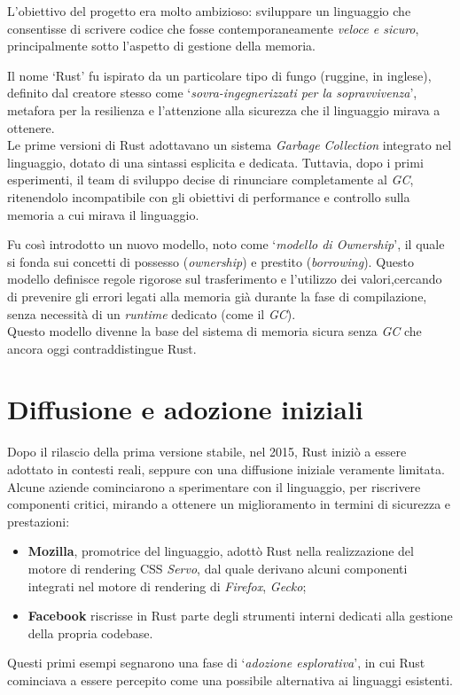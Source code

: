 L'obiettivo del progetto era molto ambizioso: sviluppare un linguaggio che consentisse di scrivere codice 
che fosse contemporaneamente \textit{veloce e sicuro}, principalmente sotto l'aspetto di gestione della memoria.

Il nome `Rust' fu ispirato da un particolare tipo di fungo (ruggine, in inglese), definito dal creatore 
stesso come `\textit{sovra-ingegnerizzati per la sopravvivenza}', metafora per la resilienza e l'attenzione 
alla sicurezza che il linguaggio mirava a ottenere. \hfill
\vspace{10pt}\\
\noindent Le prime versioni di Rust adottavano un sistema \textit{Garbage Collection} integrato nel linguaggio, dotato di una sintassi esplicita e dedicata.
Tuttavia, dopo i primi esperimenti, il team di sviluppo decise di rinunciare completamente al \textit{GC}, ritenendolo incompatibile con gli obiettivi di performance 
e controllo sulla memoria a cui mirava il linguaggio.

Fu così introdotto un nuovo modello, noto come `\textit{modello di Ownership}', il quale si fonda 
sui concetti di possesso (\textit{ownership}) e prestito (\textit{borrowing}). 
Questo modello definisce regole rigorose sul trasferimento e l'utilizzo dei valori,cercando di prevenire gli errori legati 
alla memoria già durante la fase di compilazione, senza necessità di un \textit{runtime} dedicato (come il \textit{GC}).
\vspace{10pt}\\
\noindent Questo modello divenne la base del sistema di memoria sicura senza \textit{GC} che ancora oggi contraddistingue Rust.

\section{Diffusione e adozione iniziali}
Dopo il rilascio della prima versione stabile, nel 2015, Rust iniziò a essere adottato in contesti reali, seppure con una
diffusione iniziale veramente limitata. Alcune aziende cominciarono a sperimentare con il linguaggio, per riscrivere
componenti critici, mirando a ottenere un miglioramento in termini di sicurezza e prestazioni:
\begin{itemize}
    \item \textbf{Mozilla}, promotrice del linguaggio, adottò Rust nella realizzazione del motore di rendering CSS \textit{Servo}, dal quale derivano alcuni componenti integrati nel motore di rendering di \textit{Firefox}, \textit{Gecko};
    \item \textbf{Facebook} riscrisse in Rust parte degli strumenti interni dedicati alla gestione della propria codebase.
\end{itemize}
Questi primi esempi segnarono una fase di `\textit{adozione esplorativa}', in cui Rust cominciava a essere percepito come una 
possibile alternativa ai linguaggi esistenti.

